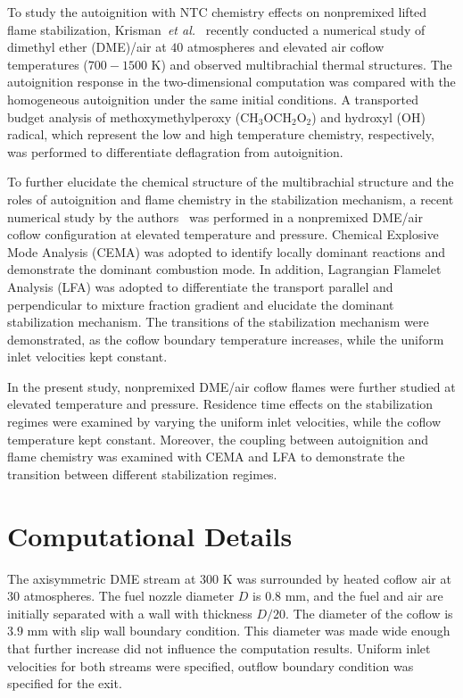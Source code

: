 \documentclass{wssci}
\begin{document}
To study the autoignition with NTC chemistry effects on nonpremixed lifted flame stabilization, Krisman~\emph{et al.}~\cite{krisman14} recently conducted a numerical study of dimethyl ether (DME)/air at $40$ atmospheres and elevated air coflow temperatures ($700-1500$ K) and observed multibrachial thermal structures.  The autoignition response in the two-dimensional computation was compared with the homogeneous autoignition under the same initial conditions.  A transported budget analysis of methoxymethylperoxy (CH$_3$OCH$_2$O$_2$) and hydroxyl (OH) radical, which represent the low and high temperature chemistry, respectively, was performed to differentiate deflagration from autoignition.  

To further elucidate the chemical structure of the multibrachial structure and the roles of autoignition and flame chemistry in the stabilization mechanism, a recent numerical study by the authors~\cite{deng15} was performed in a nonpremixed DME/air coflow configuration at elevated temperature and pressure.  Chemical Explosive Mode Analysis (CEMA) was adopted to identify locally dominant reactions and demonstrate the dominant combustion mode.  In addition, Lagrangian Flamelet Analysis (LFA) was adopted to differentiate the transport parallel and perpendicular to mixture fraction gradient and elucidate the dominant stabilization mechanism.  The transitions of the stabilization mechanism were demonstrated, as the coflow boundary temperature increases, while the uniform inlet velocities kept constant.

In the present study, nonpremixed DME/air coflow flames were further studied at elevated temperature and pressure.  Residence time effects on the stabilization regimes were examined by varying the uniform inlet velocities, while the coflow temperature kept constant.  Moreover, the coupling between autoignition and flame chemistry was examined with CEMA and LFA to demonstrate the transition between different stabilization regimes.                         

\section{Computational Details}

The axisymmetric DME stream at $300$ K was surrounded by heated coflow air at $30$ atmospheres.  The fuel nozzle diameter $D$ is $0.8$ mm, and the fuel and air are initially separated with a wall with thickness $D/20$.  The diameter of the coflow is $3.9$ mm with slip wall boundary condition.  This diameter was made wide enough that further increase did not influence the computation results.  Uniform inlet velocities for both streams were specified, outflow boundary condition was specified for the exit.  
\end{document}
